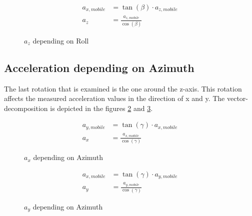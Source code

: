 \documentclass[12pt, a4paper, oneside, british]{article}
\begin{document}
\begin{figure}[htb]
    \centering
    \begin{minipage}{0.5\textwidth}
        \centering
        \captionsetup{justification=centering}
        
        \caption{$a_z$ depending on Roll}
        \label{fig:zRoll}
    \end{minipage}%
    \hfill
    \begin{minipage}{0.5\textwidth}
        \centering
			\begin{align} 
				a_{x, mobile} &= \tan(\beta) \cdot a_{z, mobile}\\ 
				a_z &= \frac{a_{z, mobile}}{\cos(\beta)}
			\end{align}
    \end{minipage}
\end{figure}

\FloatBarrier
\subsection{Acceleration depending on Azimuth}
The last rotation that is examined is the one around the z-axis. This rotation
affects the measured acceleration values in the direction of x and y. The
vector-decomposition is depicted in the figures \ref{fig:xAzimuth} and
\ref{fig:yAzimuth}.

\begin{figure}[htb]
    \centering
    \begin{minipage}{0.5\textwidth}
        \centering
        \captionsetup{justification=centering}
        
        \caption{$a_x$ depending on Azimuth}
        \label{fig:xAzimuth}
    \end{minipage}%
    \hfill
    \begin{minipage}{0.5\textwidth}
        \centering
			\begin{align} 
				a_{y, mobile} &= \tan(\gamma) \cdot {a_{x, mobile}}\\
				a_x &= \frac{a_{x, mobile}}{\cos(\gamma)}
			\end{align}
    \end{minipage}
\end{figure}

\begin{figure}[htb]
    \centering
    \begin{minipage}{0.5\textwidth}
        \centering
        \captionsetup{justification=centering}
        
        \caption{$a_y$ depending on Azimuth}
        \label{fig:yAzimuth}
    \end{minipage}%
    \hfill
    \begin{minipage}{0.5\textwidth}
        \centering
			\begin{align} 
				a_{x, mobile} &= \tan(\gamma) \cdot a_{y, mobile}\\ 
				a_y &= \frac{a_{y, mobile}}{\cos(\gamma)}
			\end{align}
    \end{minipage}
\end{figure}
\end{document}
